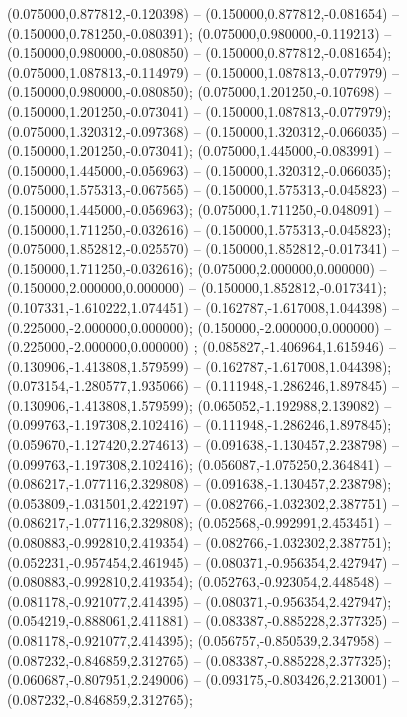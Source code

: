  (0.075000,0.877812,-0.120398) -- (0.150000,0.877812,-0.081654) -- (0.150000,0.781250,-0.080391);
 (0.075000,0.980000,-0.119213) -- (0.150000,0.980000,-0.080850) -- (0.150000,0.877812,-0.081654);
 (0.075000,1.087813,-0.114979) -- (0.150000,1.087813,-0.077979) -- (0.150000,0.980000,-0.080850);
 (0.075000,1.201250,-0.107698) -- (0.150000,1.201250,-0.073041) -- (0.150000,1.087813,-0.077979);
 (0.075000,1.320312,-0.097368) -- (0.150000,1.320312,-0.066035) -- (0.150000,1.201250,-0.073041);
 (0.075000,1.445000,-0.083991) -- (0.150000,1.445000,-0.056963) -- (0.150000,1.320312,-0.066035);
 (0.075000,1.575313,-0.067565) -- (0.150000,1.575313,-0.045823) -- (0.150000,1.445000,-0.056963);
 (0.075000,1.711250,-0.048091) -- (0.150000,1.711250,-0.032616) -- (0.150000,1.575313,-0.045823);
 (0.075000,1.852812,-0.025570) -- (0.150000,1.852812,-0.017341) -- (0.150000,1.711250,-0.032616);
 (0.075000,2.000000,0.000000) -- (0.150000,2.000000,0.000000) -- (0.150000,1.852812,-0.017341);
 (0.107331,-1.610222,1.074451) -- (0.162787,-1.617008,1.044398) -- (0.225000,-2.000000,0.000000);
 (0.150000,-2.000000,0.000000) -- (0.225000,-2.000000,0.000000) ;
 (0.085827,-1.406964,1.615946) -- (0.130906,-1.413808,1.579599) -- (0.162787,-1.617008,1.044398);
 (0.073154,-1.280577,1.935066) -- (0.111948,-1.286246,1.897845) -- (0.130906,-1.413808,1.579599);
 (0.065052,-1.192988,2.139082) -- (0.099763,-1.197308,2.102416) -- (0.111948,-1.286246,1.897845);
 (0.059670,-1.127420,2.274613) -- (0.091638,-1.130457,2.238798) -- (0.099763,-1.197308,2.102416);
 (0.056087,-1.075250,2.364841) -- (0.086217,-1.077116,2.329808) -- (0.091638,-1.130457,2.238798);
 (0.053809,-1.031501,2.422197) -- (0.082766,-1.032302,2.387751) -- (0.086217,-1.077116,2.329808);
 (0.052568,-0.992991,2.453451) -- (0.080883,-0.992810,2.419354) -- (0.082766,-1.032302,2.387751);
 (0.052231,-0.957454,2.461945) -- (0.080371,-0.956354,2.427947) -- (0.080883,-0.992810,2.419354);
 (0.052763,-0.923054,2.448548) -- (0.081178,-0.921077,2.414395) -- (0.080371,-0.956354,2.427947);
 (0.054219,-0.888061,2.411881) -- (0.083387,-0.885228,2.377325) -- (0.081178,-0.921077,2.414395);
 (0.056757,-0.850539,2.347958) -- (0.087232,-0.846859,2.312765) -- (0.083387,-0.885228,2.377325);
 (0.060687,-0.807951,2.249006) -- (0.093175,-0.803426,2.213001) -- (0.087232,-0.846859,2.312765);
